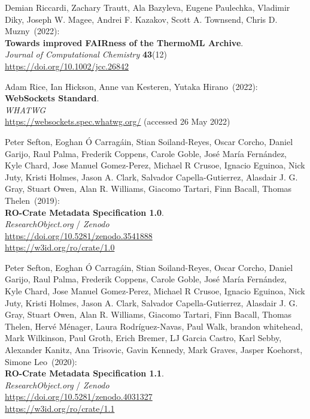 \begin{thebibliography}{9}
Demian Riccardi, Zachary Trautt, Ala Bazyleva, Eugene Paulechka, Vladimir Diky, Joseph W. Magee, Andrei F. Kazakov, Scott A. Townsend, Chris D. Muzny~(2022): \\
\textbf{Towards improved {FAIRness} of the {ThermoML} Archive}.\\
\emph{Journal of Computational Chemistry} \textbf{43}(12)\\
\url{https://doi.org/10.1002/jcc.26842}


Adam Rice, Ian Hickson, Anne van Kesteren, Yutaka Hirano~(2022): \\
\textbf{WebSockets Standard}. \\
\emph{WHATWG}\\
\url{https://websockets.spec.whatwg.org/}
(accessed 26 May 2022)

Peter Sefton, Eoghan Ó Carragáin, Stian Soiland-Reyes, Oscar
Corcho, Daniel Garijo, Raul Palma, Frederik Coppens, Carole Goble, José
María Fernández, Kyle Chard, Jose Manuel Gomez-Perez, Michael R Crusoe,
Ignacio Eguinoa, Nick Juty, Kristi Holmes, Jason A. Clark, Salvador
Capella-Gutierrez, Alasdair J. G. Gray, Stuart Owen, Alan R. Williams,
Giacomo Tartari, Finn Bacall, Thomas Thelen~(2019): \\
\textbf{RO-Crate Metadata Specification 1.0}.\\
\emph{ResearchObject.org} / \emph{Zenodo}\\
\url{https://doi.org/10.5281/zenodo.3541888}\\
\url{https://w3id.org/ro/crate/1.0}

Peter Sefton, Eoghan Ó Carragáin, Stian Soiland-Reyes, Oscar
Corcho, Daniel Garijo, Raul Palma, Frederik Coppens, Carole Goble, José
María Fernández, Kyle Chard, Jose Manuel Gomez-Perez, Michael R Crusoe,
Ignacio Eguinoa, Nick Juty, Kristi Holmes, Jason A. Clark, Salvador
Capella-Gutierrez, Alasdair J. G. Gray, Stuart Owen, Alan R. Williams,
Giacomo Tartari, Finn Bacall, Thomas Thelen, Hervé Ménager, Laura
Rodríguez-Navas, Paul Walk, brandon whitehead, Mark Wilkinson, Paul
Groth, Erich Bremer, LJ Garcia Castro, Karl Sebby, Alexander Kanitz, Ana
Trisovic, Gavin Kennedy, Mark Graves, Jasper Koehorst, Simone Leo~(2020): \\
\textbf{RO-Crate Metadata Specification 1.1}.\\
\emph{ResearchObject.org} / \emph{Zenodo}\\
\url{https://doi.org/10.5281/zenodo.4031327}\\
\url{https://w3id.org/ro/crate/1.1}


\end{thebibliography}

